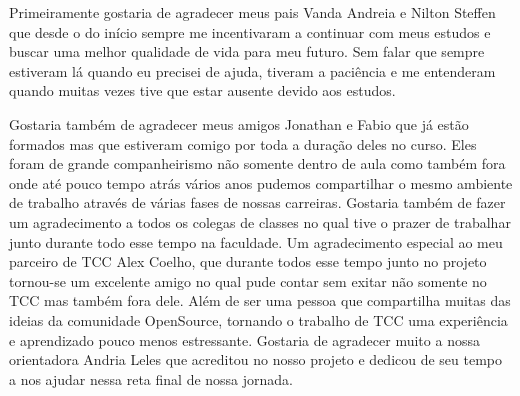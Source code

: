 \begin{agradecimentos}
Primeiramente gostaria de agradecer meus pais Vanda Andreia e Nilton Steffen que desde o do início sempre me incentivaram a continuar com meus estudos e buscar uma melhor qualidade de vida para meu futuro. Sem falar que sempre estiveram lá quando eu precisei de ajuda, tiveram a paciência e me entenderam quando muitas vezes tive que estar ausente devido aos estudos.

Gostaria também de agradecer meus amigos Jonathan e Fabio que já estão formados mas que estiveram comigo por toda a duração deles no curso. Eles foram de grande companheirismo não somente dentro de aula como também fora onde até pouco tempo atrás vários anos pudemos compartilhar o mesmo ambiente de trabalho através de várias fases de nossas carreiras. Gostaria também de fazer um agradecimento a todos os colegas de classes no qual tive o prazer de trabalhar junto durante todo esse tempo na faculdade.
Um agradecimento especial ao meu parceiro de TCC Alex Coelho, que durante todos esse tempo junto no projeto tornou-se um excelente amigo no qual pude contar sem exitar não somente no TCC mas também fora dele. Além de ser uma pessoa que compartilha muitas das ideias da comunidade OpenSource, tornando o trabalho de TCC uma experiência e aprendizado pouco menos estressante. Gostaria de agradecer muito a nossa orientadora Andria Leles que acreditou no nosso projeto e dedicou de seu tempo a nos ajudar nessa reta final de nossa jornada.
\end{agradecimentos}